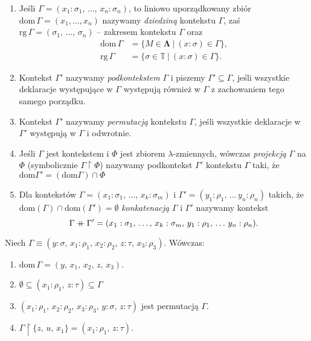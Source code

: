 \begin{definicja}
  \begin{enumerate}[label=(\arabic*)]
  \setlength\itemsep{0em}
  \item Jeśli \(\Gamma=(x_1:\sigma_1,\,\dots,\,x_n:\sigma_n)\), to liniowo
    uporządkowany zbiór \( \mathrm{dom}\, \Gamma = (x_1,\dots,x_n) \) nazywamy
      \emph{dziedziną} kontekstu \(\Gamma\), zaś \( \mathrm{rg}\, \Gamma =(\sigma_1,\,\dots,\,\sigma_n)\) -- zakresem kontekstu \(\Gamma\) oraz
      \begin{align*}
        \mathrm{dom}\,\Gamma &= \{M\in\mathbf{\Lambda}\ |\ (x:\sigma) \in \Gamma \},\\
        \mathrm{rg}\,\Gamma &= \{\sigma\in\mathbb{T}\ |\ (x:\sigma) \in \Gamma \}.
      \end{align*}
    \item Kontekst \(\Gamma'\) nazywamy \emph{podkontekstem} \(\Gamma\) i piszemy \(\Gamma'\subseteq\Gamma\), jeśli wszystkie deklaracje występujące w \(\Gamma\) występują również w \(\Gamma\) z zachowaniem tego samego porządku.
    \item Kontekst \(\Gamma'\) nazywamy \emph{permutacją} kontekstu \(\Gamma\), jeśli wszystkie deklaracje w \(\Gamma'\) występują w \(\Gamma\) i odwrotnie.
    \item Jeśli \(\Gamma\) jest kontekstem i \(\Phi\) jest zbiorem \(\lambda\)-zmiennych, wówczas \emph{projekcją} \(\Gamma\) na \(\Phi\) (symbolicznie \(\Gamma \upharpoonright \Phi\)) nazywamy podkontekst \(\Gamma'\) kontekstu \(\Gamma\) taki, że \(\mathrm{dom} \Gamma' = (\mathrm{dom} \Gamma) \cap \Phi\)  
    \item Dla kontekstów \(\Gamma=(x_1:\sigma_1,\,\dots,\,x_k:\sigma_m)\) i \(\Gamma'=(y_1:\rho_1,\,\dots\,y_n:\rho_n)\) takich, że \(\mathrm{dom}(\Gamma)\cap\mathrm{dom}(\Gamma')=\emptyset\) \emph{konkatenacją} \(\Gamma\) i \(\Gamma'\) nazywamy kontekst
      \[
        \Gamma \mathbin{+\mkern-10mu+} \Gamma' = (x_1:\sigma_1,\,\dots,\,x_k:\sigma_m,\,y_1:\rho_1,\,\dots\,y_n:\rho_n).
      \]
  \end{enumerate}
\end{definicja}
\begin{przyklad}
  Niech \(\Gamma\equiv(y:\sigma,\,x_1:\rho_1,\,x_2:\rho_2,\,z:\tau,\,x_3:\rho_3)\). Wówczas:
  \begin{enumerate}[label=(\arabic*)]
    \setlength\itemsep{0em}
    \item \(\mathrm{dom}\,\Gamma=(y,\,x_1,\,x_2,\,z,\,x_3)\).
    \item \(\emptyset \subseteq (x_1:\rho_1,\,z:\tau)\subseteq\Gamma\)
    \item \((x_1:\rho_1,\,x_2:\rho_2,\,x_3:\rho_3,\,y:\sigma,\,z:\tau)\) jest permutacją \(\Gamma\).
    \item \(\Gamma\upharpoonright \{z,\,u,\,x_1\}=(x_1:\rho_1,\,z:\tau).\)
  \end{enumerate}
\end{przyklad}

